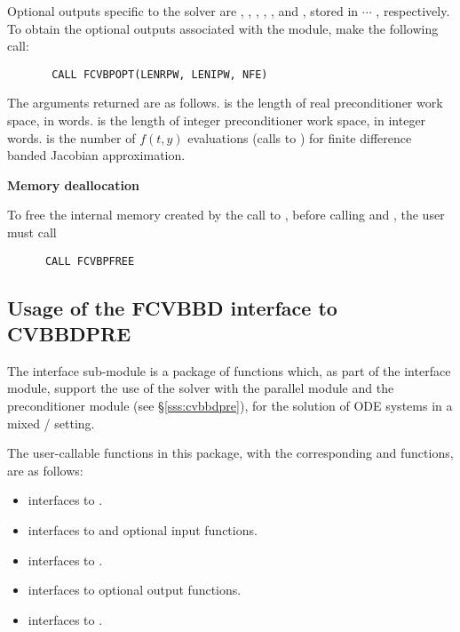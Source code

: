 \begin{Steps}
  Optional outputs specific to the {\spgmr} solver are , ,
  , , , and , stored in  $\cdots$
  , respectively.
  To obtain the optional outputs associated with the {\cvbandpre} module, make
  the following call:
\begin{verbatim}
       CALL FCVBPOPT(LENRPW, LENIPW, NFE)
\end{verbatim}
  The arguments returned are as follows.
   is the length of real preconditioner work space, in 
  words.  is the length of integer preconditioner work space, in
  integer words.  is the number of $f(t,y)$ evaluations (calls to
  ) for finite difference banded Jacobian approximation.
  
\item {\bf Memory deallocation}

  To free the internal memory created by the call to , before
  calling  and , the user must call
\begin{verbatim}
      CALL FCVBPFREE
\end{verbatim}

\end{Steps}

\subsection{Usage of the FCVBBD interface to CVBBDPRE}

The {\fcvbbd} interface sub-module is a package of {\C} functions which,
as part of the {\fcvode} interface module, support the use of the
{\cvode} solver with the parallel {\nvecp} module and the {\cvbbdpre} 
preconditioner module (see \S\ref{sss:cvbbdpre}), for the solution of 
ODE systems in a mixed {\F}/{\C} setting.  

The user-callable functions in this package, with the corresponding
{\cvode} and {\cvbbdpre} functions, are as follows: 
\begin{itemize}
\item {}
  interfaces to .
\item {}
  interfaces to  and {\spgmr} optional input functions.
\item {}
  interfaces to .
\item {}
  interfaces to {\cvbbdpre} optional output functions.
\item {}
  interfaces to .
\end{itemize}

